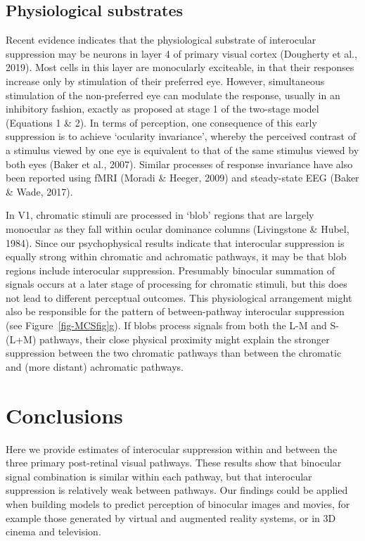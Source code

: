 \documentclass[
  letterpaper,
  DIV=11,
  numbers=noendperiod]{scrartcl}
\begin{document}
\hypertarget{physiological-substrates}{%
\subsection{Physiological substrates}\label{physiological-substrates}}

Recent evidence indicates that the physiological substrate of
interocular suppression may be neurons in layer 4 of primary visual
cortex (Dougherty et al., 2019). Most cells in this layer are
monocularly exciteable, in that their responses increase only by
stimulation of their preferred eye. However, simultaneous stimulation of
the non-preferred eye can modulate the response, usually in an
inhibitory fashion, exactly as proposed at stage 1 of the two-stage
model (Equations 1 \& 2). In terms of perception, one consequence of
this early suppression is to achieve `ocularity invariance', whereby the
perceived contrast of a stimulus viewed by one eye is equivalent to that
of the same stimulus viewed by both eyes (Baker et al., 2007). Similar
processes of response invariance have also been reported using fMRI
(Moradi \& Heeger, 2009) and steady-state EEG (Baker \& Wade, 2017).

In V1, chromatic stimuli are processed in `blob' regions that are
largely monocular as they fall within ocular dominance columns
(Livingstone \& Hubel, 1984). Since our psychophysical results indicate
that interocular suppression is equally strong within chromatic and
achromatic pathways, it may be that blob regions include interocular
suppression. Presumably binocular summation of signals occurs at a later
stage of processing for chromatic stimuli, but this does not lead to
different perceptual outcomes. This physiological arrangement might also
be responsible for the pattern of between-pathway interocular
suppression (see Figure~\ref{fig-MCSfig}g). If blobs process signals
from both the L-M and S-(L+M) pathways, their close physical proximity
might explain the stronger suppression between the two chromatic
pathways than between the chromatic and (more distant) achromatic
pathways.

\hypertarget{conclusions}{%
\section{Conclusions}\label{conclusions}}

Here we provide estimates of interocular suppression within and between
the three primary post-retinal visual pathways. These results show that
binocular signal combination is similar within each pathway, but that
interocular suppression is relatively weak between pathways. Our
findings could be applied when building models to predict perception of
binocular images and movies, for example those generated by virtual and
augmented reality systems, or in 3D cinema and television.
\end{document}
